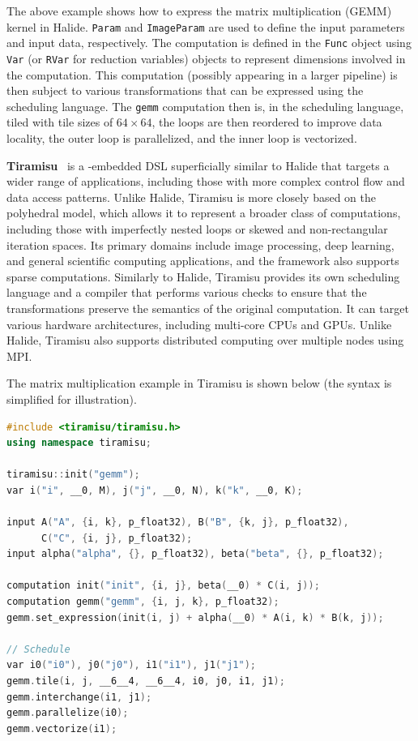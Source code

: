 The above example shows how to express the matrix multiplication (GEMM) kernel in Halide. \lstinline{Param} and \lstinline{ImageParam} are used to define the input parameters and input data, respectively. The computation is defined in the \lstinline{Func} object using \lstinline{Var} (or \lstinline{RVar} for reduction variables) objects to represent dimensions involved in the computation. This computation (possibly appearing in a larger pipeline) is then subject to various transformations that can be expressed using the scheduling language. The \lstinline{gemm} computation then is, in the scheduling language, tiled with tile sizes of $64 \times 64$, the loops are then reordered to improve data locality, the outer loop is parallelized, and the inner loop is vectorized.

\textbf{Tiramisu}~\cite{baghdadi2019tiramisu} is a \cpp-embedded DSL superficially similar to Halide that targets a wider range of applications, including those with more complex control flow and data access patterns. Unlike Halide, Tiramisu is more closely based on the polyhedral model, which allows it to represent a broader class of computations, including those with imperfectly nested loops or skewed and non-rectangular iteration spaces. Its primary domains include image processing, deep learning, and general scientific computing applications, and the framework also supports sparse computations. Similarly to Halide, Tiramisu provides its own scheduling language and a compiler that performs various checks to ensure that the transformations preserve the semantics of the original computation. It can target various hardware architectures, including multi-core CPUs and GPUs. Unlike Halide, Tiramisu also supports distributed computing over multiple nodes using MPI\@.

The matrix multiplication example in Tiramisu is shown below (the syntax is simplified for illustration).

\begin{lstlisting}[language=C++, morekeywords={p_float32, var, input, computation}]
#include <tiramisu/tiramisu.h>
using namespace tiramisu;

tiramisu::init("gemm");
var i("i", __0, M), j("j", __0, N), k("k", __0, K);

input A("A", {i, k}, p_float32), B("B", {k, j}, p_float32),
      C("C", {i, j}, p_float32);
input alpha("alpha", {}, p_float32), beta("beta", {}, p_float32);

computation init("init", {i, j}, beta(__0) * C(i, j));
computation gemm("gemm", {i, j, k}, p_float32);
gemm.set_expression(init(i, j) + alpha(__0) * A(i, k) * B(k, j));

// Schedule
var i0("i0"), j0("j0"), i1("i1"), j1("j1");
gemm.tile(i, j, __6__4, __6__4, i0, j0, i1, j1);
gemm.interchange(i1, j1);
gemm.parallelize(i0);
gemm.vectorize(i1);
\end{lstlisting}

